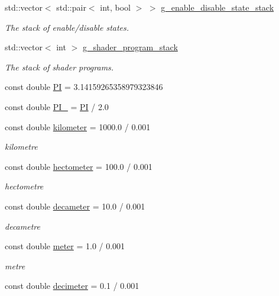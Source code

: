 \begin{DoxyCompactItemize}
std::vector$<$ std::pair$<$ int, bool $>$ $>$ \hyperlink{namespace_utilities_a12dfa64d0c2f8186e94336a73defa7a8}{g\_\-enable\_\-disable\_\-state\_\-stack}
\begin{DoxyCompactList}\small\item\em The stack of enable/disable states. \end{DoxyCompactList}\item 
std::vector$<$ int $>$ \hyperlink{namespace_utilities_adf21242b77777527da1f9e6d8f72a1e5}{g\_\-shader\_\-program\_\-stack}
\begin{DoxyCompactList}\small\item\em The stack of shader programs. \end{DoxyCompactList}\item 
const double \hyperlink{namespace_utilities_a119d98992bec0bd0923f88ebf77ed86f}{PI} = 3.14159265358979323846
\item 
const double \hyperlink{namespace_utilities_a3d5b18587a483b13232097d2ac93341f}{PI\_} = \hyperlink{namespace_utilities_a119d98992bec0bd0923f88ebf77ed86f}{PI} / 2.0
\item 
const double \hyperlink{namespace_utilities_a06654149ce3cba96084c785b079a7a31}{kilometer} = 1000.0 / 0.001
\begin{DoxyCompactList}\small\item\em kilometre \end{DoxyCompactList}\item 
const double \hyperlink{namespace_utilities_a3fb2d462bd1e7dc8fe4dbc1ad4f28ff3}{hectometer} = 100.0 / 0.001
\begin{DoxyCompactList}\small\item\em hectometre \end{DoxyCompactList}\item 
const double \hyperlink{namespace_utilities_a66e92dbad293594bf063d31aa9305983}{decameter} = 10.0 / 0.001
\begin{DoxyCompactList}\small\item\em decametre \end{DoxyCompactList}\item 
const double \hyperlink{namespace_utilities_a2b626049c35729f994e12d5f4f950d6b}{meter} = 1.0 / 0.001
\begin{DoxyCompactList}\small\item\em metre \end{DoxyCompactList}\item 
const double \hyperlink{namespace_utilities_a66145380051759756714059815f45e18}{decimeter} = 0.1 / 0.001

\end{DoxyCompactItemize}
